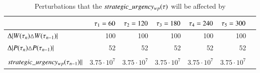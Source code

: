 \begin{table}[H]
	\centering
	\begin{tabular}{lrrrrrr}
	\toprule
	                                                                                                                   & $\VarMetaTime_1 = 60$ & $\VarMetaTime_2 = 120$ & $\VarMetaTime_3 = 180$ & $\VarMetaTime_4 = 240$ & $\VarMetaTime_5 = 300$ \\ \midrule
	$\Delta |\SetWorkOrder[\VarMetaTime_{n}]{} \triangle \SetWorkOrder[\VarMetaTime_{n-1}]{}              |$           & 100                                                           & 100                                                            & 100                                                            & 100                                                            & 100                                                      \\ \midrule
	$\Delta |\SetPeriod[\VarMetaTime_{n}]{} \triangle \SetPeriod[\VarMetaTime_{n-1}]{}                    |$           & 52                                                            & 52                                                             & 52                                                             & 52                                                             & 52                                                       \\ \midrule
	\makecell{$ ||\ParStrategicUrgency[\VarMetaTime_{n}] -$\\ $\ParStrategicUrgency[\VarMetaTime_{n - 1}]||$}        & $3.75 \cdot 10^{7}$                                           & $3.75 \cdot 10^{7}$                                            & $3.75 \cdot 10^{7}$                                            & $3.75 \cdot 10^{7}$                                            & $3.75 \cdot 10^{7}$                                       \\ \bottomrule
	\end{tabular}
	\caption{Perturbations that the $\ParStrategicUrgency$ will be affected by
	}\label{tab:responses:urgency-change}
\end{table}
